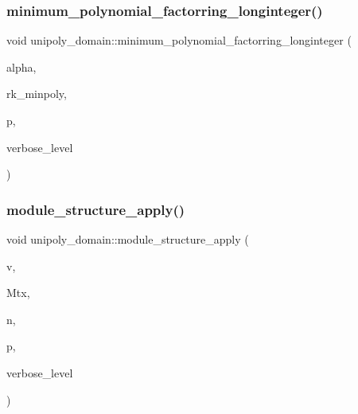 \mbox{\label{classunipoly__domain_a2c953e21fad2df88627ac8a289f3a77b}} 
\subsubsection{\texorpdfstring{minimum\+\_\+polynomial\+\_\+factorring\+\_\+longinteger()}{minimum\_polynomial\_factorring\_longinteger()}}
{\footnotesize\ttfamily void unipoly\+\_\+domain\+::minimum\+\_\+polynomial\+\_\+factorring\+\_\+longinteger (\begin{DoxyParamCaption}\item[{\mbox{\hyperlink{classlonginteger__object}{longinteger\+\_\+object}} \&}]{alpha,  }\item[{\mbox{\hyperlink{classlonginteger__object}{longinteger\+\_\+object}} \&}]{rk\+\_\+minpoly,  }\item[{\mbox{\hyperlink{galois_8h_a09fddde158a3a20bd2dcadb609de11dc}{I\+NT}}}]{p,  }\item[{\mbox{\hyperlink{galois_8h_a09fddde158a3a20bd2dcadb609de11dc}{I\+NT}}}]{verbose\+\_\+level }\end{DoxyParamCaption})}

\mbox{\label{classunipoly__domain_a770579859bb43cdd52c8cf42169272cd}} 
\subsubsection{\texorpdfstring{module\+\_\+structure\+\_\+apply()}{module\_structure\_apply()}}
{\footnotesize\ttfamily void unipoly\+\_\+domain\+::module\+\_\+structure\+\_\+apply (\begin{DoxyParamCaption}\item[{\mbox{\hyperlink{galois_8h_a09fddde158a3a20bd2dcadb609de11dc}{I\+NT}} $\ast$}]{v,  }\item[{\mbox{\hyperlink{galois_8h_a09fddde158a3a20bd2dcadb609de11dc}{I\+NT}} $\ast$}]{Mtx,  }\item[{\mbox{\hyperlink{galois_8h_a09fddde158a3a20bd2dcadb609de11dc}{I\+NT}}}]{n,  }\item[{\mbox{\hyperlink{galois_8h_a77ca58de3d2da6172242493dd9c8aaa8}{unipoly\+\_\+object}}}]{p,  }\item[{\mbox{\hyperlink{galois_8h_a09fddde158a3a20bd2dcadb609de11dc}{I\+NT}}}]{verbose\+\_\+level }\end{DoxyParamCaption})}

